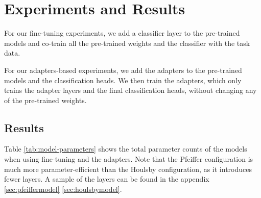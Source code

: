 \documentclass[10pt,twocolumn,letterpaper]{article}
\begin{document}
\section{Experiments and Results}

For our fine-tuning experiments, we add a classifier layer to the pre-trained models and co-train all the pre-trained weights and the classifier with the task data.

For our adapters-based experiments, we add the adapters to the pre-trained models and the classification heads. We then train the adapters, which only trains the adapter layers and the final classification heads, without changing any of the pre-trained weights.


\subsection{Results}


Table \ref{tab:model-parameters} shows the total parameter counts of the models when using fine-tuning and the adapters. Note that the Pfeiffer configuration is much more parameter-efficient than the Houlsby configuration, as it introduces fewer layers. A sample of the layers can be found in the appendix \ref{sec:pfeiffermodel} \ref{sec:houlsbymodel}.
\end{document}
